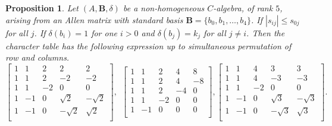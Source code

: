 \documentclass[12pt]{amsart}
\newtheorem{prop}[thm]{Proposition}
\begin{document}
\begin{prop}\label{CharacterTableExpreesionWithDifferentNormPropRank5}
Let $(A,{{\mathbf B}}, \delta)$ be a non-homogeneous $C$-algebra, of rank $5$, arising from an Allen matrix with standard  basis ${{\mathbf B}}=\{b_0,b_1,\hdots, b_4\}$. If $|s_{ij}|\leq s_{0j} $ for all $j$.  If $\delta(b_i)=1$ for one $i>0$ and $\delta(b_j)=k_j$ for all $j \neq i$. Then the character table has the following expression up to simultaneous permutation of row and columns.
$$\left[
   \begin{array}{ccccc}
     1 & 1 & 2 &2&2\\
     1 & 1 &  2 &  -2&-2\\
      1 & 1 & -2& 0&0\\
     1 &  -1 & 0&   \sqrt{2} &-\sqrt{2}\\
     1 & -1 & 0&  -\sqrt{2} & \sqrt{2}\\
   \end{array}\right], ~~\left[
   \begin{array}{ccccc}
     1 & 1 & 2 &4&8\\
     1 & 1 &   2 & 4&-8\\
      1 &  1 & 2&  -4& 0\\
     1 & 1 &  -2&  0& 0\\
     1 &  -1 &  0&  0& 0\\
\end{array}\right],
   \left[
   \begin{array}{ccccc}
     1 & 1 & 4 &3&3\\
     1 & 1 &  4 &  -3&-3\\
      1 & 1 & -2& 0&0\\
     1 &  -1 & 0&   \sqrt{3} &-\sqrt{3}\\
     1 & -1 & 0&  -\sqrt{3} & \sqrt{3}\\
   \end{array}\right].
$$
\end{prop}
\end{document}
